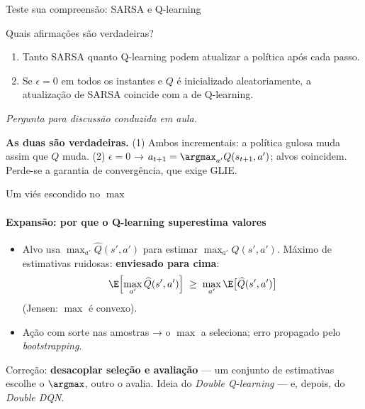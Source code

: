 \documentclass[aspectratio=169, 11pt]{beamer}
\newcommand{\paradiscussao}{\smallskip
  {\footnotesize\color{rlCinza}\itshape Pergunta para discussão conduzida em aula.}}
\newcommand{\Qhat}{\widehat{Q}}
\begin{document}
\begin{frame}{Teste sua compreensão: SARSA e Q-learning}

  \begin{quizbox}{}
    Quais afirmações são verdadeiras?
    \begin{enumerate}\setlength{\itemsep}{0.2ex}
      \item Tanto SARSA quanto Q-learning podem atualizar a política após
        cada passo.
      \item Se $\epsilon = 0$ em todos os instantes e $Q$ é inicializado
        aleatoriamente, a atualização de SARSA coincide com a de Q-learning.
    \end{enumerate}
  \end{quizbox}
  \paradiscussao

  \pause
  \begin{respbox}
    \textbf{As duas são verdadeiras.} (1) Ambos incrementais: a política
    gulosa muda assim que $Q$ muda. (2) $\epsilon = 0$ →
    $a_{t+1} = \argmax_{a'} Q(s_{t+1},a')$; alvos coincidem. Perde-se a
    garantia de convergência, que exige GLIE.
  \end{respbox}
\end{frame}

\begin{frame}{Um viés escondido no $\max$}
  \framesubtitle{Expansão: por que o Q-learning superestima valores}

  \begin{itemize}\setlength{\itemsep}{0.35ex}
    \item Alvo usa $\max_{a'} \Qhat(s',a')$ para estimar
      $\max_{a'} Q(s',a')$. Máximo de estimativas ruidosas: \textbf{enviesado
      para cima}:
      \[ \E\Bigl[\max_{a'} \Qhat(s',a')\Bigr] \;\ge\; \max_{a'} \E\bigl[\Qhat(s',a')\bigr] \]
      (Jensen: $\max$ é convexo).
    \item Ação com sorte nas amostras → o $\max$ a seleciona; erro
      propagado pelo \emph{bootstrapping}.
  \end{itemize}


  \begin{ideiabox}
    Correção: \textbf{desacoplar seleção e avaliação} — um conjunto de
    estimativas escolhe o $\argmax$, outro o avalia. Ideia do \emph{Double
    Q-learning} — e, depois, do \emph{Double DQN}.
  \end{ideiabox}
\end{frame}
\end{document}
